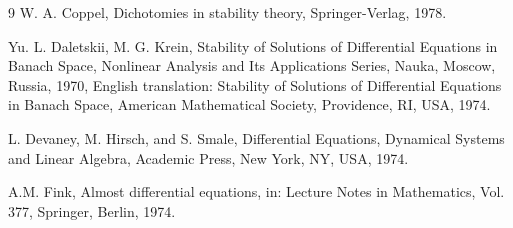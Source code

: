 \documentclass[english,reqno]{amsart}
\numberwithin{equation}{section}
\theoremstyle{plain}
\theoremstyle{definition}
\theoremstyle{remark}
\begin{document}
\begin{thebibliography}{9}
 W. A. Coppel, Dichotomies in stability theory, Springer-Verlag, 1978.








 Yu. L. Daletskii, M. G. Krein, Stability of Solutions of Differential Equations in Banach
Space, Nonlinear Analysis and Its Applications Series, Nauka, Moscow, Russia, 1970, English
translation: Stability of Solutions of Differential Equations in Banach Space, American
Mathematical Society, Providence, RI, USA, 1974.

 L. Devaney, M. Hirsch, and S. Smale, Differential Equations,
Dynamical Systems and Linear Algebra, Academic Press, New York, NY, USA, 1974.



 A.M. Fink, Almost differential equations, in: Lecture Notes in Mathematics, Vol. 377, Springer, Berlin, 1974.

















\end{thebibliography}
\end{document}
